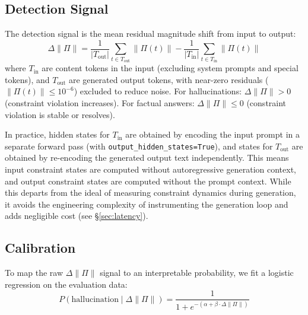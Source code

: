 \documentclass[11pt]{article}
\begin{document}
\subsection{Detection Signal}

The detection signal is the mean residual magnitude shift from input to output:
\begin{equation}
\Delta\|\Pi\| = \frac{1}{|T_{\text{out}}|} \sum_{t \in T_{\text{out}}} \|\Pi(t)\| - \frac{1}{|T_{\text{in}}|} \sum_{t \in T_{\text{in}}} \|\Pi(t)\|
\label{eq:delta}
\end{equation}
where $T_{\text{in}}$ are content tokens in the input (excluding system prompts and special tokens), and $T_{\text{out}}$ are generated output tokens, with near-zero residuals ($\|\Pi(t)\| \leq 10^{-6}$) excluded to reduce noise. For hallucinations: $\Delta\|\Pi\| > 0$ (constraint violation increases). For factual answers: $\Delta\|\Pi\| \leq 0$ (constraint violation is stable or resolves).

In practice, hidden states for $T_{\text{in}}$ are obtained by encoding the input prompt in a separate forward pass (with \texttt{output\_hidden\_states=True}), and states for $T_{\text{out}}$ are obtained by re-encoding the generated output text independently. This means input constraint states are computed without autoregressive generation context, and output constraint states are computed without the prompt context. While this departs from the ideal of measuring constraint dynamics during generation, it avoids the engineering complexity of instrumenting the generation loop and adds negligible cost (see \S\ref{sec:latency}).

\subsection{Calibration}

To map the raw $\Delta\|\Pi\|$ signal to an interpretable probability, we fit a logistic regression on the evaluation data:
\begin{equation}
P(\text{hallucination} \mid \Delta\|\Pi\|) = \frac{1}{1 + e^{-(\alpha + \beta \cdot \Delta\|\Pi\|)}}
\label{eq:calibration}
\end{equation}
\end{document}
